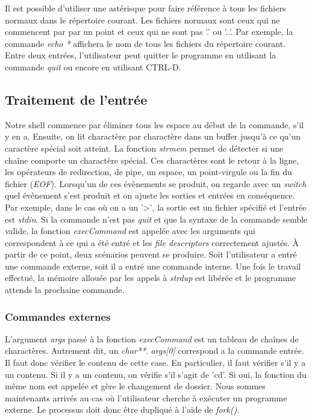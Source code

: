 \documentclass[letterpaper,12pt]{scrartcl}
\begin{document}
			Il est possible d'utiliser une astérisque pour faire référence à tous les fichiers normaux dans le répertoire courant. Les fichiers normaux sont ceux qui ne commencent par par un point et ceux qui ne sont pas '.' ou '..'. Par exemple, la commande \textit{echo *} affichera le nom de tous les fichiers du répertoire courant. Entre deux entrées, l'utilisateur peut quitter le programme en utilisant la commande \textit{quit} ou encore en utilisant CTRL-D.

		\subsection{Traitement de l'entrée}
			Notre shell commence par éliminer tous les espace au début de la commande, s'il y en a. Ensuite, on lit charactère par charactère dans un buffer jusqu'à ce qu'un caractère spécial soit atteint. La fonction \textit{strmem} permet de détecter si une chaîne comporte un charactère spécial. Ces charactères sont le retour à la ligne, les opérateurs de redirection, de pipe, un espace, un point-virgule ou la fin du fichier (\textit{EOF}). Lorsqu'un de ces évènements se produit, on regarde avec un \textit{switch} quel évènement s'est produit et on ajuste les sorties et entrées en conséquence. Par exemple, dans le cas où on a un '>', la sortie est un fichier spécifié et l'entrée est \textit{stdin}. Si la commande n'est pas \textit{quit} et que la syntaxe de la commande semble valide, la fonction \textit{execCommand} est appelée avec les arguments qui correspondent à ce qui a été entré et les \textit{file descriptors} correctement ajustés. À partir de ce point, deux scénarios peuvent se produire. Soit l'utilisateur a entré une commande externe, soit il a entré une commande interne. Une fois le travail effectué, la mémoire allouée par les appels à \textit{strdup} est libérée et le programme attends la prochaine commande. 
			
			\subsubsection{Commandes externes}
			L'argument \textit{args} passé à la fonction \textit{execCommand} est un tableau de chaînes de charactères. Autrement dit, un \textit{char**}. \textit{args[0]} correspond a la commande entrée. Il faut donc vérifier le contenu de cette case. En particulier, il faut vérifier s'il y a un contenu. Si il y a un contenu, on vérifie s'il s'agit de 'cd'. Si oui, la fonction du même nom est appelée et gère le changement de dossier. Nous sommes maintenants arrivés au cas où l'utilisateur cherche à exécuter un programme externe. Le processus doit donc être dupliqué à l'aide de \textit{fork()}.
\end{document}
